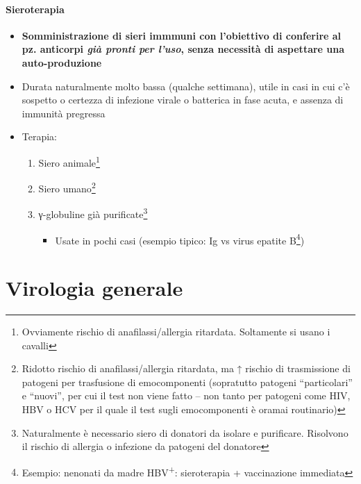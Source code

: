 \documentclass[italian,]{article}
\providecommand{\tightlist}{%
  \setlength{\itemsep}{0pt}\setlength{\parskip}{0pt}}
\begin{document}
\hypertarget{sieroterapia}{%
\subsection{Sieroterapia}\label{sieroterapia}}

\begin{itemize}
\tightlist
\item
  \textbf{Somministrazione di sieri immmuni con l'obiettivo di conferire
  al pz. anticorpi \emph{già pronti per l'uso}, senza necessità di
  aspettare una auto-produzione}
\item
  Durata naturalmente molto bassa (qualche settimana), utile in casi in
  cui c'è sospetto o certezza di infezione virale o batterica in fase
  acuta, e assenza di immunità pregressa
\item
  Terapia:

  \begin{enumerate}
  \def\labelenumi{\arabic{enumi}.}
  \tightlist
  \item
    Siero animale\footnote{Ovviamente rischio di anafilassi/allergia
      ritardata. Soltamente si usano i cavalli}
  \item
    Siero umano\footnote{Ridotto rischio di anafilassi/allergia
      ritardata, ma ↑ rischio di trasmissione di patogeni per
      trasfusione di emocomponenti (sopratutto patogeni ``particolari''
      e ``nuovi'', per cui il test non viene fatto -- non tanto per
      patogeni come HIV, HBV o HCV per il quale il test sugli
      emocomponenti è oramai routinario)}
  \item
    γ-globuline già purificate\footnote{Naturalmente è necessario siero
      di donatori da isolare e purificare. Risolvono il rischio di
      allergia o infezione da patogeni del donatore}

    \begin{itemize}
    \tightlist
    \item
      Usate in pochi casi (esempio tipico: Ig vs virus epatite
      B\footnote{Esempio: nenonati da madre HBV\textsuperscript{+}:
        sieroterapia + vaccinazione immediata})
    \end{itemize}
  \end{enumerate}
\end{itemize}

\clearpage

\part{Virologia generale}
\end{document}
